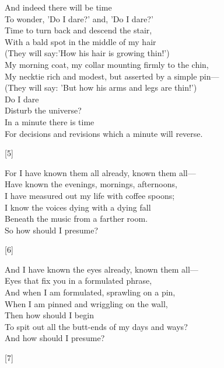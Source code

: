 \documentclass{article}
\newcommand\tab[1][1cm]{\hspace*{#1}}
\begin{document}
\begin{multicols}{2}

\begin{minipage}{10cm}
\begin{flushleft}
    \doublespacing
    And indeed there will be time\\
    To wonder, 'Do I dare?' and, 'Do I dare?'\\
    Time to turn back and descend the stair,\\
    With a bald spot in the middle of my hair\\
    (They will say:'How his hair is growing thin!')\\
    My morning coat, my collar mounting firmly to the chin,\\
    My necktie rich and modest, but asserted by a simple pin---\\
    (They will say: 'But how his arms and legs are thin!')\\
    Do I dare\\
    Disturb the universe?\\
    In a minute there is time\\
    For decisions and revisions which a minute will reverse.
    \begin{center}[5]\end{center}
\end{flushleft}
\end{minipage}

\begin{minipage}{9cm}
\begin{flushright}
    \doublespacing
    For I have known them all already, known them all---\\
    Have known the evenings, mornings, afternoons,\\
    I have measured out my life with coffee spoons;\\
    I know the voices dying with a dying fall\\
    Beneath the music from a farther room.\\
    So how should I presume?\tab{}
    \begin{center}[6]\end{center}
\end{flushright}

\begin{minipage}{8cm}
    \doublespacing
    And I have known the eyes already, known them all---\\
    Eyes that fix you in a formulated phrase,\\
    And when I am formulated, sprawling on a pin,\\
    When I am pinned and wriggling on the wall,\\
    Then how should I begin\\
    To spit out all the butt-ends of my days and ways?\\
    \tab{}And how should I presume?
    \begin{center}[7]\end{center}
\end{minipage}


\end{minipage}
\end{multicols}
\end{document}
